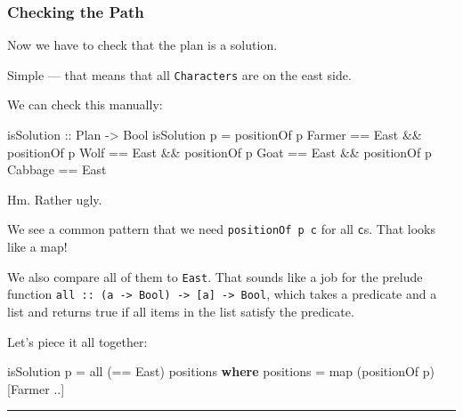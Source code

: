 \documentclass[]{article}
\newenvironment{Shaded}{}{}
\newcommand{\KeywordTok}[1]{\textcolor[rgb]{0.00,0.44,0.13}{\textbf{{#1}}}}
\newcommand{\DataTypeTok}[1]{\textcolor[rgb]{0.56,0.13,0.00}{{#1}}}
\newcommand{\OtherTok}[1]{\textcolor[rgb]{0.00,0.44,0.13}{{#1}}}
\newcommand{\FunctionTok}[1]{\textcolor[rgb]{0.02,0.16,0.49}{{#1}}}
\newcommand{\NormalTok}[1]{{#1}}
\begin{document}
\subsubsection{Checking the Path}\label{checking-the-path}

Now we have to check that the plan is a solution.

Simple --- that means that all \texttt{Characters} are on the east side.

We can check this manually:

\begin{Shaded}
\begin{Highlighting}[]
\OtherTok{isSolution ::} \DataTypeTok{Plan} \OtherTok{->} \DataTypeTok{Bool}
\NormalTok{isSolution p }\FunctionTok{=}
    \NormalTok{positionOf p }\DataTypeTok{Farmer} \FunctionTok{==} \DataTypeTok{East}
    \FunctionTok{&&} \NormalTok{positionOf p }\DataTypeTok{Wolf} \FunctionTok{==} \DataTypeTok{East}
    \FunctionTok{&&} \NormalTok{positionOf p }\DataTypeTok{Goat} \FunctionTok{==} \DataTypeTok{East}
    \FunctionTok{&&} \NormalTok{positionOf p }\DataTypeTok{Cabbage} \FunctionTok{==} \DataTypeTok{East}
\end{Highlighting}
\end{Shaded}

Hm. Rather ugly.

We see a common pattern that we need \texttt{positionOf\ p\ c} for all
\texttt{c}s. That looks like a map!

We also compare all of them to \texttt{East}. That sounds like a job for
the prelude function
\texttt{all\ ::\ (a\ -\textgreater{}\ Bool)\ -\textgreater{}\ {[}a{]}\ -\textgreater{}\ Bool},
which takes a predicate and a list and returns true if all items in the
list satisfy the predicate.

Let's piece it all together:

\begin{Shaded}
\begin{Highlighting}[]
\NormalTok{isSolution p }\FunctionTok{=} \NormalTok{all (}\FunctionTok{==} \DataTypeTok{East}\NormalTok{) positions}
    \KeywordTok{where}
        \NormalTok{positions }\FunctionTok{=} \NormalTok{map (positionOf p) [}\DataTypeTok{Farmer} \FunctionTok{..}\NormalTok{]}
\end{Highlighting}
\end{Shaded}

\begin{center}\rule{0.5\linewidth}{\linethickness}\end{center}
\end{document}
